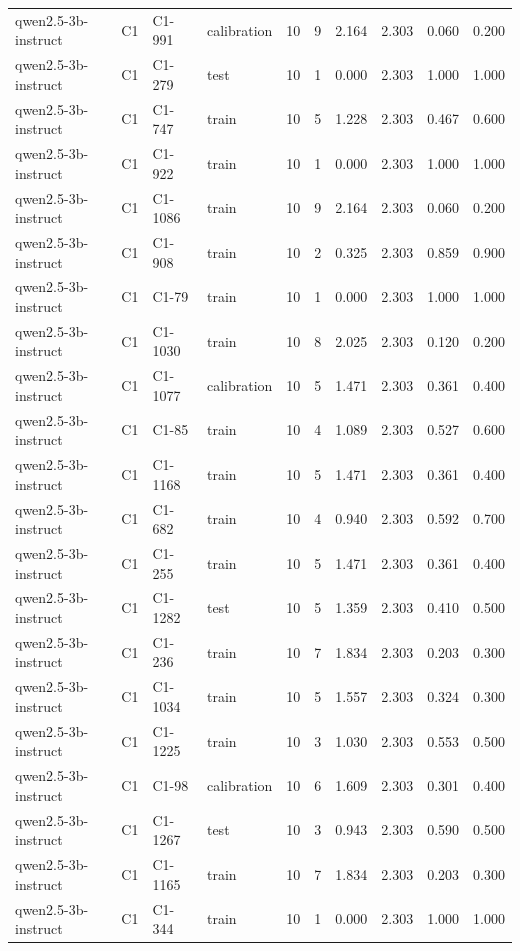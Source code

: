 \begin{table}
\begin{tabular}{llllrrrrrr}
qwen2.5-3b-instruct & C1 & C1-991 & calibration & 10 & 9 & 2.164 & 2.303 & 0.060 & 0.200 \\
qwen2.5-3b-instruct & C1 & C1-279 & test & 10 & 1 & 0.000 & 2.303 & 1.000 & 1.000 \\
qwen2.5-3b-instruct & C1 & C1-747 & train & 10 & 5 & 1.228 & 2.303 & 0.467 & 0.600 \\
qwen2.5-3b-instruct & C1 & C1-922 & train & 10 & 1 & 0.000 & 2.303 & 1.000 & 1.000 \\
qwen2.5-3b-instruct & C1 & C1-1086 & train & 10 & 9 & 2.164 & 2.303 & 0.060 & 0.200 \\
qwen2.5-3b-instruct & C1 & C1-908 & train & 10 & 2 & 0.325 & 2.303 & 0.859 & 0.900 \\
qwen2.5-3b-instruct & C1 & C1-79 & train & 10 & 1 & 0.000 & 2.303 & 1.000 & 1.000 \\
qwen2.5-3b-instruct & C1 & C1-1030 & train & 10 & 8 & 2.025 & 2.303 & 0.120 & 0.200 \\
qwen2.5-3b-instruct & C1 & C1-1077 & calibration & 10 & 5 & 1.471 & 2.303 & 0.361 & 0.400 \\
qwen2.5-3b-instruct & C1 & C1-85 & train & 10 & 4 & 1.089 & 2.303 & 0.527 & 0.600 \\
qwen2.5-3b-instruct & C1 & C1-1168 & train & 10 & 5 & 1.471 & 2.303 & 0.361 & 0.400 \\
qwen2.5-3b-instruct & C1 & C1-682 & train & 10 & 4 & 0.940 & 2.303 & 0.592 & 0.700 \\
qwen2.5-3b-instruct & C1 & C1-255 & train & 10 & 5 & 1.471 & 2.303 & 0.361 & 0.400 \\
qwen2.5-3b-instruct & C1 & C1-1282 & test & 10 & 5 & 1.359 & 2.303 & 0.410 & 0.500 \\
qwen2.5-3b-instruct & C1 & C1-236 & train & 10 & 7 & 1.834 & 2.303 & 0.203 & 0.300 \\
qwen2.5-3b-instruct & C1 & C1-1034 & train & 10 & 5 & 1.557 & 2.303 & 0.324 & 0.300 \\
qwen2.5-3b-instruct & C1 & C1-1225 & train & 10 & 3 & 1.030 & 2.303 & 0.553 & 0.500 \\
qwen2.5-3b-instruct & C1 & C1-98 & calibration & 10 & 6 & 1.609 & 2.303 & 0.301 & 0.400 \\
qwen2.5-3b-instruct & C1 & C1-1267 & test & 10 & 3 & 0.943 & 2.303 & 0.590 & 0.500 \\
qwen2.5-3b-instruct & C1 & C1-1165 & train & 10 & 7 & 1.834 & 2.303 & 0.203 & 0.300 \\
qwen2.5-3b-instruct & C1 & C1-344 & train & 10 & 1 & 0.000 & 2.303 & 1.000 & 1.000 \\

\end{tabular}
\end{table}
